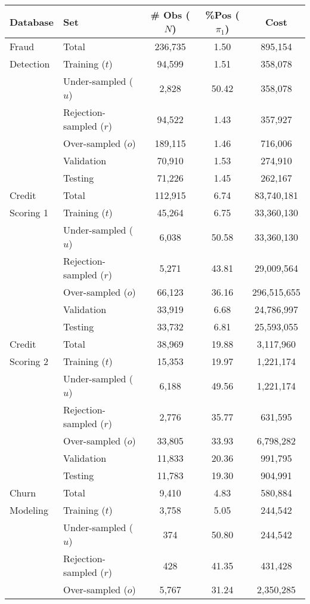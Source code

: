 \begin{table}
  \centering
  \footnotesize
  \begin{tabular}{l l c c c } %
    \hline
    \textbf{Database}& \textbf{Set}&  \textbf{\# Obs} ($N$) & \textbf{\%Pos} ($\pi_1$)& 
    \textbf{Cost} \\
    \hline
    Fraud &Total&236,735&1.50&895,154\\
    Detection&  Training ($t$)&94,599&1.51&358,078\\
    &Under-sampled ($u$)&2,828&50.42&358,078\\
    &Rejection-sampled ($r$)&94,522&1.43&357,927\\
    &Over-sampled ($o$)&189,115&1.46&716,006\\
    &Validation&70,910&1.53&274,910\\
    &Testing&71,226&1.45&262,167\\
    \hline
    Credit  & Total&112,915&6.74&83,740,181\\
    Scoring 1 & Training ($t$)&45,264&6.75&33,360,130\\
    &Under-sampled ($u$)&6,038&50.58&33,360,130\\
    &Rejection-sampled ($r$)&5,271&43.81&29,009,564\\
    &Over-sampled ($o$)&66,123&36.16&296,515,655\\
    &Validation&33,919&6.68&24,786,997\\
    &Testing&33,732&6.81&25,593,055\\
    \hline
    Credit &Total&38,969&19.88&3,117,960\\
    Scoring 2&Training ($t$)&15,353&19.97&1,221,174\\
    &Under-sampled ($u$)&6,188&49.56&1,221,174\\
    &Rejection-sampled ($r$)&2,776&35.77&631,595\\
    &Over-sampled ($o$)&33,805&33.93&6,798,282\\
    &Validation&11,833&20.36&991,795\\
    &Testing&11,783&19.30&904,991\\
    \hline
    Churn&Total&9,410&4.83&580,884\\
    Modeling&Training ($t$)&3,758&5.05&244,542\\
    &Under-sampled ($u$) &374&50.80&244,542\\
    &Rejection-sampled ($r$)&428&41.35&431,428\\
    &Over-sampled ($o$) &5,767&31.24&2,350,285\\

\end{tabular}
\end{table}
